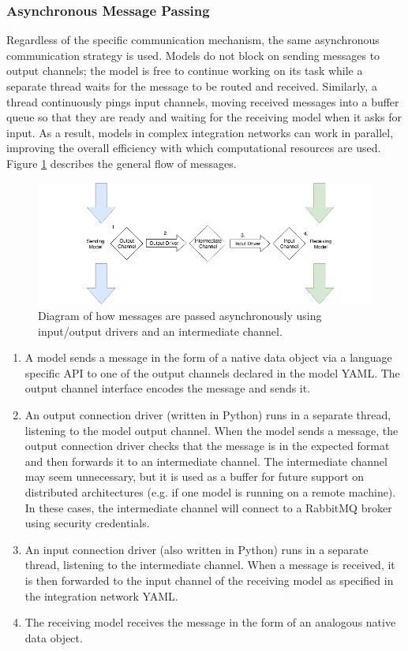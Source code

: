 \documentclass[journal]{IEEEtran}
\begin{document}
\subsubsection{Asynchronous Message Passing}\label{SSS:async}
%
Regardless of the specific communication mechanism, the same asynchronous
communication strategy is used. Models do not block on sending messages to 
output channels; the model is free to continue working on its task while 
a separate thread waits for the message to be routed and received. Similarly, 
a thread continuously pings input channels, moving received messages into a 
buffer queue so that they are ready and waiting for the receiving model 
when it asks for input. As a result, models in complex integration networks 
can work in parallel, improving the overall efficiency with which computational 
resources are used. Figure \ref{fig:async} describes the general flow of messages.
%
\ifinclfig
 	\begin{figure}[htbp]
	\begin{center}
	\includegraphics[width=\columnwidth,keepaspectratio]{./images/io_drivers.png}
	\caption{Diagram of how messages are passed asynchronously using input/output drivers and an intermediate channel.}
	\label{fig:async}
	\end{center}
	\end{figure}
\fi
%
\begin{enumerate}
	\item A model sends a message in the form of a native data object via a language 
specific API to one of the output channels declared in the model YAML. The output channel interface encodes the message and sends it.
	\item An output connection driver (written in Python) runs in a separate thread, listening to the model output channel. When the model sends a message, the output connection driver checks that the message is in the expected format and then forwards it to an intermediate channel. The intermediate channel may seem unnecessary, but it is used as a buffer for future support on distributed architectures (e.g. if one model is running on a remote machine). In these cases, the intermediate channel will connect to a RabbitMQ broker using security credentials.
	\item An input connection driver (also written in Python) runs in a separate thread, listening to the intermediate channel. When a message is received, it is then forwarded to the input channel of the receiving model as specified in the integration network YAML.
	\item The receiving model receives the message in the form of an analogous native data object.
\end{enumerate}
\end{document}
